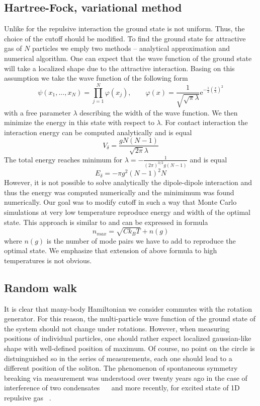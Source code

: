 \documentclass{article}
\begin{document}
\subsection{Hartree-Fock, variational method}
    Unlike for the repulsive interaction the ground state is not uniform. Thus, the choice of the cutoff should be modified.
    To find the ground state for attractive gas of $N$ particles we emply two methods -- analytical approximation and numerical algorithm. One can expect that the wave function of the ground state will take a localized shape due to the attractive interaction. Basing on this assumption we take the wave function of the following form
    $$ \psi(x_1,...,x_N) =\prod _{j=1}^N \varphi(x_j), \qquad \varphi(x)=\frac{1}{\sqrt{\sqrt{\pi}\lambda}} \text{e}^{-\frac{1}{2}(\frac{x}{\lambda})^2} $$
    with a free parameter $\lambda$ describing the width of the wave function. We then minimize the energy in this state with respect to $\lambda$. For contact interaction the interaction energy can be computed analytically and is equal
    $$ V_{\delta} = \frac{g N(N-1)}{\sqrt{2 \pi} \lambda} $$
    The total energy reaches minimum for $\lambda =-\frac{1}{ (2 \pi) ^{3/2} g (N-1)} $ and is equal
    $$ E_{\delta} = -\pi g^2 (N-1)^2 N $$
    However, it is not possible to solve analytically the dipole-dipole interaction and thus the energy was computed numerically and the minimimum was found numerically.
    Our goal was to modify cutoff in such a way that Monte Carlo simulations at very low temperature reproduce energy and width of the optimal state. This approach is similar to \cite{bienias2011statisticala} and can be expressed in formula
    \begin{equation}
        n_{max}=\sqrt{C k_B T}+n(g)
    \end{equation}
    where $n(g)$ is the number of mode pairs we have to add to reproduce the optimal state. We emphasize that extension of above formula to high temperatures is not obvious.
\subsection{Random walk}
    It is clear that many-body Hamiltonian we consider commutes with the rotation generator. For this reason, the multi-particle wave function of the ground state of the system should not change under rotations. However, when measuring positions of individual particles, one should rather expect localized gaussian-like shape with well-defined position of maximum. Of course, no point on the circle is distuinguished so in the series of measurements, each one should lead to a different position of the soliton. The phenomenon of spontaneous symmetry breaking via measurement was understood over twenty years ago in the case of interference of two condensates ~\cite{javanainen1996quantum}~\cite{andrews1997observation} and more recently, for excited state of 1D repulsive gas ~\cite{syrwid2015lieb}.
    
\end{document}
